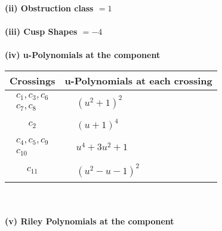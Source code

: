 \documentclass[1p]{elsarticle_modified}
\theoremstyle{definition}
\begin{document}
\flushleft \textbf{(ii) Obstruction class $= 1$}\\~\\
\flushleft \textbf{(iii) Cusp Shapes $= -4$}\\~\\
\newpage\renewcommand{\arraystretch}{1}
\flushleft \textbf{(iv) u-Polynomials at the component}\newline \\
\begin{tabular}{m{50pt}|m{274pt}}
Crossings & \hspace{64pt}u-Polynomials at each crossing \\
\hline $$\begin{aligned}c_{1},c_{3},c_{6}\\c_{7},c_{8}\end{aligned}$$&$\begin{aligned}
&(u^2+1)^2
\end{aligned}$\\
\hline $$\begin{aligned}c_{2}\end{aligned}$$&$\begin{aligned}
&(u+1)^4
\end{aligned}$\\
\hline $$\begin{aligned}c_{4},c_{5},c_{9}\\c_{10}\end{aligned}$$&$\begin{aligned}
&u^4+3 u^2+1
\end{aligned}$\\
\hline $$\begin{aligned}c_{11}\end{aligned}$$&$\begin{aligned}
&(u^2- u-1)^2
\end{aligned}$\\
\hline
\end{tabular}\\~\\
\newpage\renewcommand{\arraystretch}{1}
\flushleft \textbf{(v) Riley Polynomials at the component}\newline \\
\end{document}
